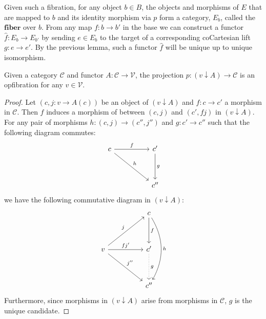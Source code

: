 Given such a fibration, for any object $b \in B$, the objects and morphisms of $E$ that are mapped to $b$ and its identity morphism via $p$ form a category, $E_b$, called the $\textbf{fiber}$ over $b$. From any map $f : b \to b'$ in the base we can construct a functor $\hat f : E_b \to E_{b'}$ by sending $e \in E_b$ to the target of a corresponding coCartesian lift $g : e \to e'$. By the previous lemma, such a functor $\hat f$ will be unique up to unique isomorphism.
\begin{thm}
Given a category $\mathcal{C}$ and functor $A : \mathcal{C} \to \mathcal{V}$, the projection $p : (v \downarrow A) \to \mathcal{C}$ is an opfibration for any $v \in \mathcal{V}$.
\begin{proof}
Let $(c, j: v \to A(c))$ be an object of $(v \downarrow A)$ and $f: c \to c'$ a morphism in $\mathcal{C}$. Then $f$ induces a morphism of between $(c, j)$ and $(c', fj)$ in $(v \downarrow A)$. For any pair of morphisms $h : (c, j) \to (c'', j'')$ and $g : c' \to c''$ such that the following diagram commutes:
\[
\ti
c \ar[r, "f"] \ar[rd, "h"] & c' \ar[d, "g"]\\
& c''
\kz
\]
we have the following commutative diagram in $(v \downarrow A)$:
\[
\ti
& c \ar[d, "f"] \ar[dd, "h", bend left]\\
v \ar[ru, "j"] \ar[rd, "j''"] \ar[r, "f j'"]& c' \ar[d, dotted, "g"]\\
& c''
\kz
\]
Furthermore, since morphisms in $(v \downarrow A)$ arise from morphisms in $\mathcal{C}$, $g$ is the unique candidate.
\end{proof}
\end{thm}
